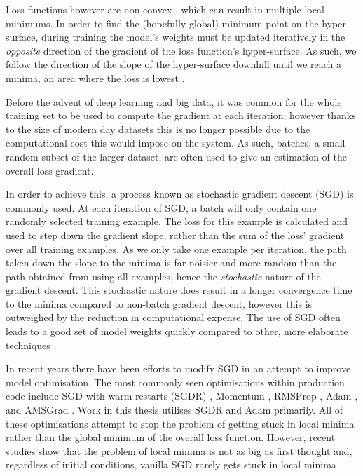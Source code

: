 Loss functions however are non-convex \cite{choromanska_loss_2015}, which can result in multiple local minimums. In order to find the (hopefully global) minimum point on the hyper-surface, during training the model's weights must be updated iteratively in the \textit{opposite} direction of the gradient of the loss function's hyper-surface. As such, we follow the direction of the slope of the hyper-surface downhill until we reach a minima, an area where the loss is lowest \cite{ruder_overview_2016}. 

Before the advent of deep learning and big data, it was common for the whole training set to be used to compute the gradient at each iteration; however thanks to the size of modern day datasets this is no longer possible due to the computational cost this would impose on the system. As such, batches, a small random subset of the larger dataset, are often used to give an estimation of the overall loss gradient.

In order to achieve this, a process known as stochastic gradient descent (SGD) is commonly used. At each iteration of SGD, a batch will only contain one randomly selected training example. The loss for this example is calculated and used to step down the gradient slope, rather than the sum of the loss' gradient over all training examples. As we only take one example per iteration, the path taken down the slope to the minima is far noisier and more random than the path obtained from using all examples, hence the \textit{stochastic} nature of the gradient descent. This stochastic nature does result in a longer convergence time to the minima compared to non-batch gradient descent, however this is outweighed by the reduction in computational expense. The use of SGD often leads to a good set of model weights quickly compared to other, more elaborate techniques \cite{bottou_tradeoffs_2008}. 

In recent years there have been efforts to modify SGD in an attempt to improve model optimisation. The most commonly seen optimisations within production code include SGD with warm restarts (SGDR) \cite{loshchilov_sgdr:_2016}, Momentum \cite{qian_momentum_1999}, RMSProp \cite{tieleman_lecture_2012}, Adam \cite{kingma_adam:_2014}, and AMSGrad \cite{reddi_convergence_2019}. Work in this thesis utilises SGDR and Adam primarily. All of these optimisations attempt to stop the problem of getting stuck in local minima rather than the global minimum of the overall loss function. However, recent studies show that the problem of local minima is not as big as first thought and, regardless of initial conditions, vanilla SGD rarely gets stuck in local minima \cite{dauphin_identifying_2014, choromanska_loss_2015}.

